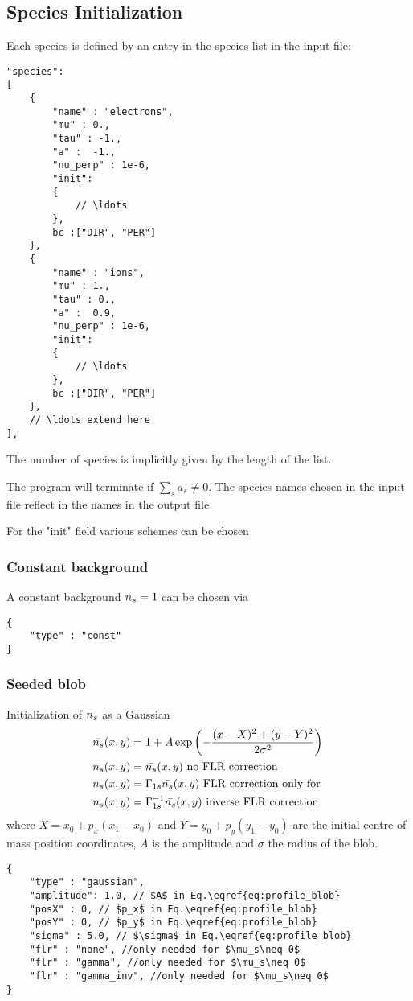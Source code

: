 \subsection{Species Initialization}
Each species is defined by an entry in the species list in the input file:
\begin{verbatim}
"species":
[
    {
        "name" : "electrons",
        "mu" : 0.,
        "tau" : -1.,
        "a" :  -1.,
        "nu_perp" : 1e-6,
        "init":
        {
            // \ldots
        },
        bc :["DIR", "PER"]
    },
    {
        "name" : "ions",
        "mu" : 1.,
        "tau" : 0.,
        "a" :  0.9,
        "nu_perp" : 1e-6,
        "init":
        {
            // \ldots
        },
        bc :["DIR", "PER"]
    },
    // \ldots extend here
],
\end{verbatim}
The number of species is implicitly given by the length of the list.
\begin{tcolorbox}[title=Note]
    The program will terminate if $\sum_s a_s \neq 0$. The species names chosen in the input file reflect in the names in the output file
\end{tcolorbox}

For the "init" field various schemes can be chosen
\subsubsection{Constant background}
A constant background ${n_s}  = 1$ can be chosen via
\begin{verbatim}
{
    "type" : "const"
}
\end{verbatim}
\subsubsection{Seeded blob}
Initialization of ${n_s} $ as a Gaussian
\begin{align} \label{eq:profile_blob}
    \bar {{n_s} }(x,y) &= 1 + A\exp\left( -\frac{(x-X)^2 + (y-Y)^2}{2\sigma^2}\right) \\
    {n_s} (x,y) &= \bar {{n_s} }(x,y) \text{ no FLR correction} \\
    {n_s} (x,y) &= \Gamma_{1s}\bar {{n_s} }(x,y) \text{ FLR correction only for } \\
    {n_s} (x,y) &= \Gamma_{1s}^{-1}\bar {{n_s} }(x,y) \text{ inverse FLR correction} \\
\end{align}
where $X = x_0 + p_x (x_1 - x_0)$ and $Y= y_0 + p_y( y_1 - y_0)$ are the initial centre of mass position coordinates, $A$ is the amplitude and $\sigma$ the
radius of the blob.
\begin{verbatim}
{
    "type" : "gaussian",
    "amplitude": 1.0, // $A$ in Eq.\eqref{eq:profile_blob}
    "posX" : 0, // $p_x$ in Eq.\eqref{eq:profile_blob}
    "posY" : 0, // $p_y$ in Eq.\eqref{eq:profile_blob}
    "sigma" : 5.0, // $\sigma$ in Eq.\eqref{eq:profile_blob}
    "flr" : "none", //only needed for $\mu_s\neq 0$
    "flr" : "gamma", //only needed for $\mu_s\neq 0$
    "flr" : "gamma_inv", //only needed for $\mu_s\neq 0$
}
\end{verbatim}
